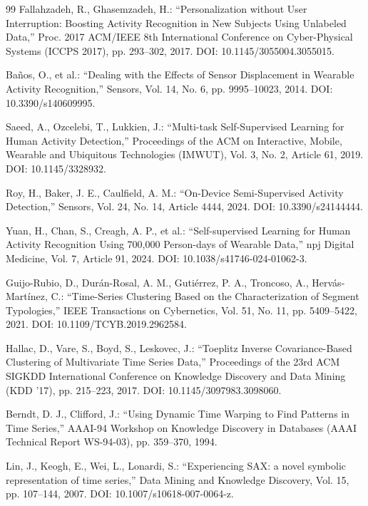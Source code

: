 \documentclass[a4paper,12pt]{jreport}
\begin{document}
\begin{thebibliography}{99}
Fallahzadeh, R., Ghasemzadeh, H.: ``Personalization without User Interruption: Boosting Activity Recognition in New Subjects Using Unlabeled Data,''
Proc. 2017 ACM/IEEE 8th International Conference on Cyber-Physical Systems (ICCPS 2017),
pp. 293--302, 2017.
DOI: 10.1145/3055004.3055015.

Ba\~{n}os, O., et al.: ``Dealing with the Effects of Sensor Displacement in Wearable Activity Recognition,''
Sensors, Vol. 14, No. 6, pp. 9995--10023, 2014.
DOI: 10.3390/s140609995.

Saeed, A., Ozcelebi, T., Lukkien, J.: ``Multi-task Self-Supervised Learning for Human Activity Detection,''
Proceedings of the ACM on Interactive, Mobile, Wearable and Ubiquitous Technologies (IMWUT),
Vol. 3, No. 2, Article 61, 2019.
DOI: 10.1145/3328932.

Roy, H., Baker, J. E., Caulfield, A. M.: ``On-Device Semi-Supervised Activity Detection,''
Sensors, Vol. 24, No. 14, Article 4444, 2024.
DOI: 10.3390/s24144444.

Yuan, H., Chan, S., Creagh, A. P., et al.: ``Self-supervised Learning for Human Activity Recognition Using 700,000 Person-days of Wearable Data,''
npj Digital Medicine, Vol. 7, Article 91, 2024.
DOI: 10.1038/s41746-024-01062-3.

Guijo-Rubio, D., Dur\'{a}n-Rosal, A. M., Guti\'{e}rrez, P. A., Troncoso, A., Herv\'{a}s-Mart\'{i}nez, C.:
``Time-Series Clustering Based on the Characterization of Segment Typologies,''
IEEE Transactions on Cybernetics, Vol. 51, No. 11, pp. 5409--5422, 2021.
DOI: 10.1109/TCYB.2019.2962584.

Hallac, D., Vare, S., Boyd, S., Leskovec, J.: ``Toeplitz Inverse Covariance-Based Clustering of Multivariate Time Series Data,''
Proceedings of the 23rd ACM SIGKDD International Conference on Knowledge Discovery and Data Mining (KDD '17),
pp. 215--223, 2017.
DOI: 10.1145/3097983.3098060.

Berndt, D. J., Clifford, J.: ``Using Dynamic Time Warping to Find Patterns in Time Series,''
AAAI-94 Workshop on Knowledge Discovery in Databases (AAAI Technical Report WS-94-03),
pp. 359--370, 1994.

Lin, J., Keogh, E., Wei, L., Lonardi, S.: ``Experiencing SAX: a novel symbolic representation of time series,''
Data Mining and Knowledge Discovery, Vol. 15, pp. 107--144, 2007.
DOI: 10.1007/s10618-007-0064-z.


\end{thebibliography}
\end{document}
